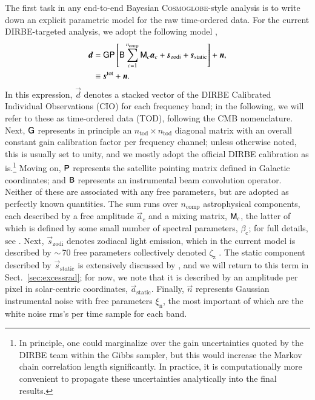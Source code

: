\documentclass{aa}
\newcommand{\dv}[0]{\vec{d}}
\newcommand{\B}[0]{\tens{B}}
\newcommand{\G}[0]{\tens{G}}
\newcommand{\n}[0]{\vec{n}}
\newcommand{\s}[0]{\vec{s}}
\renewcommand{\a}[0]{\vec{a}}
\newcommand{\M}[0]{\tens{M}}
\renewcommand{\P}[0]{\tens{P}}
\newcommand{\cosmoglobe}{\textsc{Cosmoglobe}}
\begin{document}
The first task in any end-to-end Bayesian \cosmoglobe-style analysis
is to write down an explicit parametric model for the raw time-ordered
data. For the current DIRBE-targeted analysis, we adopt the following
model \citep{CG02_01},
\begin{align}
	\label{eq:model}
	\dv &=\G\P\left[\B\sum_{c=1}^{n_{\mathrm{comp}}}\M_c\a_c+\s_{\mathrm{zodi}} +
          \s_{\mathrm{static}}\right] + \n,\\
        &\equiv \s^{\mathrm{tot}} + \n.
\end{align}
In this expression, $\dv$ denotes a stacked vector of the DIRBE
Calibrated Individual Observations (CIO) for each frequency band; in
the following, we will refer to these as time-ordered data (TOD),
following the CMB nomenclature. Next, $\G$ represents in principle an
$n_{\mathrm{tod}}\times n_{\mathrm{tod}}$ diagonal matrix with an
overall constant gain calibration factor per frequency channel; unless
otherwise noted, this is usually set to unity, and we mostly adopt the
official DIRBE calibration as is.\footnote{In principle, one could
marginalize over the gain uncertainties quoted by the DIRBE team
within the Gibbs sampler, but this would increase the Markov chain
correlation length significantly. In practice, it is computationally
more convenient to propagate these uncertainties analytically into the
final results.}  Moving on, $\P$ represents the satellite pointing
matrix defined in Galactic coordinates; and $\B$ represents an
instrumental beam convolution operator. Neither of these are
associated with any free parameters, but are adopted as perfectly
known quantities. The sum runs over $n_{\mathrm{comp}}$ astrophysical
components, each described by a free amplitude $\a_c$ and a mixing
matrix, $\M_c$, the latter of which is defined by some small number of
spectral parameters, $\beta_{\mathrm{c}}$; for full details, see
\citet{CG02_04, CG02_05}. Next, $\s_{\mathrm{zodi}}$ denotes zodiacal
light emission, which in the current model is described by $\sim$\,70
free parameters collectively denoted $\zeta_{\mathrm{z}}$
\citep{CG02_02}. The static component described by
$\s_{\mathrm{static}}$ is extensively discussed by \citet{CG02_01},
and we will return to this term in Sect.~\ref{sec:excessrad}; for now,
we note that it is described by an amplitude per pixel in
solar-centric coordinates, $\a_{\mathrm{static}}$. Finally, $\n$
represents Gaussian instrumental noise with free parameters
$\xi_{\mathrm{n}}$, the most important of which are the white noise
rms's per time sample for each band.
\end{document}
